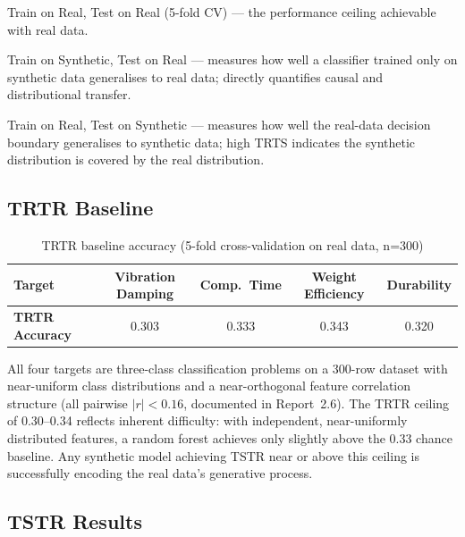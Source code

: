\documentclass[12pt,a4paper]{article}
\begin{document}
\begin{description}[leftmargin=1.8cm, style=sameline]
  \item[TRTR] Train on Real, Test on Real (5-fold CV) --- the performance ceiling achievable with real data.
  \item[TSTR] Train on Synthetic, Test on Real --- measures how well a classifier trained only on synthetic data generalises to real data; directly quantifies causal and distributional transfer.
  \item[TRTS] Train on Real, Test on Synthetic --- measures how well the real-data decision boundary generalises to synthetic data; high TRTS indicates the synthetic distribution is covered by the real distribution.
\end{description}

\subsection{TRTR Baseline}

\begin{table}[H]
\centering
\caption{TRTR baseline accuracy (5-fold cross-validation on real data, n=300)}
\label{tab:trtr}
\renewcommand{\arraystretch}{1.3}
\begin{tabular}{lcccc}
\toprule
\textbf{Target} & Vibration Damping & Comp.\ Time & Weight Efficiency & Durability \\
\midrule
\textbf{TRTR Accuracy} & 0.303 & 0.333 & 0.343 & 0.320 \\
\bottomrule
\end{tabular}
\end{table}

\begin{tcolorbox}[insightbox, title={Why TRTR is Low}]
All four targets are three-class classification problems on a 300-row dataset with near-uniform class distributions and a near-orthogonal feature correlation structure (all pairwise $|r| < 0.16$, documented in Report~2.6). The TRTR ceiling of 0.30--0.34 reflects inherent difficulty: with independent, near-uniformly distributed features, a random forest achieves only slightly above the 0.33 chance baseline. Any synthetic model achieving TSTR near or above this ceiling is successfully encoding the real data's generative process.
\end{tcolorbox}

\subsection{TSTR Results}
\end{document}
